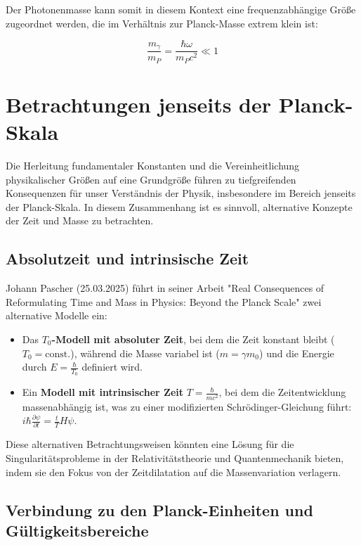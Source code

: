 \documentclass{article}
\begin{document}
	Der Photonenmasse kann somit in diesem Kontext eine frequenzabhängige Größe zugeordnet werden, die im Verhältnis zur Planck-Masse extrem klein ist:
	
	\begin{equation}
		\frac{m_{\gamma}}{m_P} = \frac{\hbar\omega}{m_P c^2} \ll 1
	\end{equation}
	
	\section{Betrachtungen jenseits der Planck-Skala}
	
	Die Herleitung fundamentaler Konstanten und die Vereinheitlichung physikalischer Größen auf eine Grundgröße führen zu tiefgreifenden Konsequenzen für unser Verständnis der Physik, insbesondere im Bereich jenseits der Planck-Skala. In diesem Zusammenhang ist es sinnvoll, alternative Konzepte der Zeit und Masse zu betrachten.
	
	\subsection{Absolutzeit und intrinsische Zeit}
	
	Johann Pascher (25.03.2025) führt in seiner Arbeit "Real Consequences of Reformulating Time and Mass in Physics: Beyond the Planck Scale" zwei alternative Modelle ein:
	
	\begin{itemize}
		\item Das \textbf{$T_0$-Modell mit absoluter Zeit}, bei dem die Zeit konstant bleibt ($T_0 = \text{const.}$), während die Masse variabel ist ($m = \gamma m_0$) und die Energie durch $E = \frac{\hbar}{T_0}$ definiert wird.
		
		\item Ein \textbf{Modell mit intrinsischer Zeit} $T = \frac{\hbar}{mc^2}$, bei dem die Zeitentwicklung massenabhängig ist, was zu einer modifizierten Schrödinger-Gleichung führt: $i\hbar\frac{\partial\psi}{\partial t} = \frac{t}{T}H\psi$.
	\end{itemize}
	
	Diese alternativen Betrachtungsweisen könnten eine Lösung für die Singularitätsprobleme in der Relativitätstheorie und Quantenmechanik bieten, indem sie den Fokus von der Zeitdilatation auf die Massenvariation verlagern.
	
	\subsection{Verbindung zu den Planck-Einheiten und Gültigkeitsbereiche}
	
\end{document}
